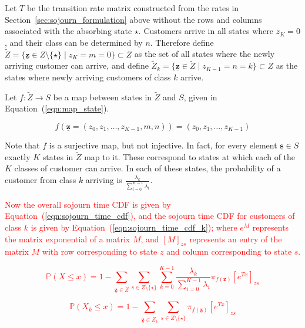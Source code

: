 \documentclass{article}
\begin{document}
Let $T$ be the transition rate matrix constructed from the rates in
Section~\ref{sec:sojourn_formulation} above without the rows and columns
associated with the absorbing state $\star$.
Customers arrive in all states where $z_K = 0$, and their class can be
determined by $n$.
Therefore define
$\tilde{Z} = \{\underline{\mathbf{z}} \in Z\setminus\{\star\} \; | \; z_K = m = 0\} \subset Z$
as the set of all states where the newly arriving customer can arrive, and
define $\tilde{Z}_k = \{\underline{\mathbf{z}} \in \tilde{Z} \; | \; z_{K-1} = n = k\} \subset Z$
as the states where newly arriving customers of class $k$ arrive.

Let $f: \tilde{Z} \rightarrow S$ be a map between states in $\tilde{Z}$ and $S$,
given in Equation~(\ref{eqn:map_state}).

\begin{equation}\label{eqn:map_state}
f\left(\underline{\mathbf{z}} = (z_0, z_1, \dots, z_{K-1}, m, n) \right) = (z_0, z_1, \dots, z_{K-1})
\end{equation}

Note that $f$ is a surjective map, but not injective. In fact, for every element
$\underline{\mathbf{s}} \in S$ exactly $K$ states in $\tilde{Z}$ map to it.
These correspond to states at which each of the $K$ classes of customer can
arrive. In each of these states, the probability of a customer from class $k$
arriving is $\frac{\lambda_k}{\sum_{i=0}^{K-1} \lambda_i}$.

\textcolor{red}{Now the overall sojourn time CDF is given by
Equation~(\ref{eqn:sojourn_time_cdf}), and the sojourn time CDF for customers of
class $k$ is given by Equation~(\ref{eqn:sojourn_time_cdf_k}); where $e^{M}$
represents the matrix exponential of a matrix $M$, and $\left[ M \right]_{zs}$
represents an entry of the matrix $M$ with row corresponding to state $z$ and
column corresponding to state $s$.}

\textcolor{red}{
\begin{equation}\label{eqn:sojourn_time_cdf}
\mathbb{P}(X \leq x) = 1 - \sum_{\underline{\mathbf{z}} \in \tilde{Z}} \sum_{s \in Z\setminus\{\star\}} \sum_{k=0}^{K-1} \frac{\lambda_k}{\sum_{i=0}^{K-1} \lambda_i} \pi_{f(\underline{\mathbf{z}})} \left[ e^{Tx} \right]_{zs}
\end{equation}
}

\textcolor{red}{
\begin{equation}\label{eqn:sojourn_time_cdf_k}
\mathbb{P}(X_k \leq x) = 1 - \sum_{\underline{\mathbf{z}} \in \tilde{Z}_k} \sum_{s \in Z\setminus\{\star\}} \pi_{f(\underline{\mathbf{z}})} \left[ e^{Tx} \right]_{zs}
\end{equation}
}
\end{document}
